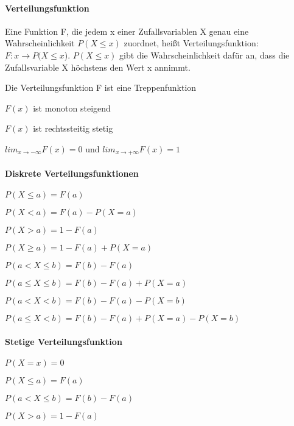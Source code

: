 \documentclass[a4paper]{article}
\begin{document}
\begin{multicols}{3}
  \paragraph{Verteilungsfunktion}
  Eine Funktion F, die jedem x einer Zufallsvariablen X genau eine Wahrscheinlichkeit $P(X\leq x)$ zuordnet, heißt Verteilungsfunktion: $F:x \rightarrow P(X\leq x$). $P(X\leq x)$ gibt die Wahrscheinlichkeit dafür an, dass die Zufallsvariable X höchstens den Wert x annimmt.
  \begin{itemize*}
    \item Die Verteilungsfunktion F ist eine Treppenfunktion
    \item $F(x)$ ist monoton steigend
    \item $F(x)$ ist rechtssteitig stetig
    \item $lim_{x\rightarrow -\infty} F(x)=0$ und $lim_{x\rightarrow +\infty} F(x) =1$
  \end{itemize*}

  \paragraph{Diskrete Verteilungsfunktionen}
  \begin{itemize*}
    \item $P(X\leq a)=F(a)$
    \item $P(X<a)= F(a)-P(X=a)$
    \item $P(X>a)= 1-F(a)$
    \item $P(X\geq a)=1-F(a)+P(X=a)$
    \item $P(a<X\leq b)=F(b)-F(a)$
    \item $P(a\leq X \leq b)=F(b)-F(a)+P(X=a)$
    \item $P(a<X<b) = F(b)-F(a)-P(X=b)$
    \item $P(a\leq X < b)=F(b)-F(a)+P(X=a)-P(X=b)$
  \end{itemize*}

  \paragraph{Stetige Verteilungsfunktion}
  \begin{itemize*}
    \item $P(X=x)=0$
    \item $P(X\leq a)=F(a)$
    \item $P(a<X\leq b)=F(b)-F(a)$
    \item $P(X>a)=1-F(a)$
  \end{itemize*}


\end{multicols}
\end{document}
